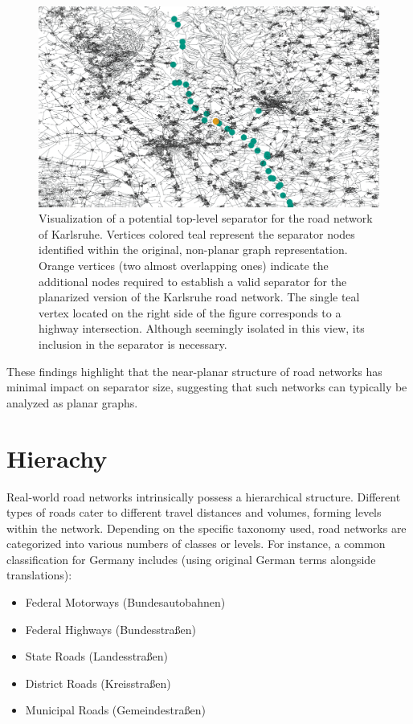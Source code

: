\begin{figure}[tbhp]
	\centering
	\includegraphics[width=0.8\linewidth]{graphics/karlsruhe_top_level_sep_extended_to_planar_wide.png}
	\caption{Visualization of a potential top-level separator for the road network of Karlsruhe.
		Vertices colored teal represent the separator nodes identified within the original, non-planar graph representation.
		Orange vertices (two almost overlapping ones) indicate the additional nodes required to establish a valid separator for the planarized version of the Karlsruhe road network.
		The single teal vertex located on the right side of the figure corresponds to a highway intersection.
		Although seemingly isolated in this view, its inclusion in the separator is necessary.}
	\label{fig:karlsruhe_planar_vs_non_planar}
\end{figure}

These findings highlight that the near-planar structure of road networks has
minimal impact on separator size, suggesting that such networks can typically
be analyzed as planar graphs.







\section{Hierachy}
\label{sec:hierarchy}

Real-world road networks intrinsically possess a hierarchical structure.
Different types of roads cater to different travel distances and volumes, forming levels within the network.
Depending on the specific taxonomy used, road networks are categorized into various numbers of classes or levels.
For instance, a common classification for Germany includes (using original German terms alongside translations):

\begin{itemize}
    \item Federal Motorways (Bundesautobahnen)
    \item Federal Highways (Bundesstraßen)
    \item State Roads (Landesstraßen)
    \item District Roads (Kreisstraßen)
    \item Municipal Roads (Gemeindestraßen)
\end{itemize}

